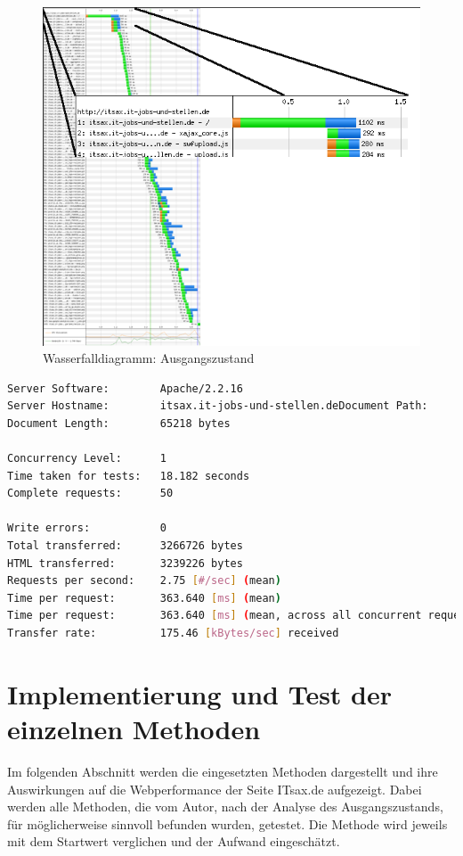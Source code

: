 \begin{figure}[!ht]
  \centering
  \includegraphics[scale=0.5]{material/start_waterfall_edited.png}
  \caption{Wasserfalldiagramm: Ausgangszustand}
  \label{fig:startwaterfall}
\end{figure}



\begin{minipage}[t]{\textwidth}
\begin{lstlisting}[language=bash,label=Startwerte gemessen mit ab,caption=Startwerte gemessen mit ab]
Server Software:        Apache/2.2.16
Server Hostname:        itsax.it-jobs-und-stellen.deDocument Path:          /
Document Length:        65218 bytes

Concurrency Level:      1
Time taken for tests:   18.182 seconds
Complete requests:      50

Write errors:           0
Total transferred:      3266726 bytes
HTML transferred:       3239226 bytes
Requests per second:    2.75 [#/sec] (mean)
Time per request:       363.640 [ms] (mean)
Time per request:       363.640 [ms] (mean, across all concurrent requests)
Transfer rate:          175.46 [kBytes/sec] received
\end{lstlisting}
\end{minipage}
\section{Implementierung und Test der einzelnen Methoden}
Im folgenden Abschnitt werden die eingesetzten Methoden dargestellt und ihre Auswirkungen auf die Webperformance der Seite ITsax.de aufgezeigt. 
Dabei werden alle Methoden, die vom Autor, nach der Analyse des Ausgangszustands, für möglicherweise sinnvoll befunden wurden, getestet. Die Methode wird jeweils mit dem Startwert verglichen und der Aufwand eingeschätzt.
